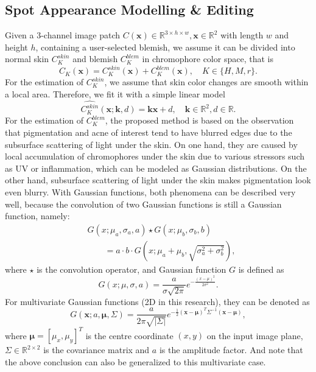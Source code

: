 \begin{spacing}{1.5}
\section{Spot Appearance Modelling \& Editing}
Given a 3-channel image patch $C(\mathbf{x})\in\mathbb{R}^{3\times h\times w}, \mathbf{x}\in\mathbb{R}^2$ with length $w$ and height $h$, containing a user-selected blemish, we assume it can be divided into normal skin $C_K^{skin}$ and blemish $C_K^{blem}$ in chromophore color space, that is
\begin{equation}
  C_K(\mathbf{x}) = C_K^{skin}(\mathbf{x}) + C_K^{blem}(\mathbf{x}),\quad K\in\{H,M,r\}.
\end{equation}
For the estimation of $C_K^{skin}$, we assume that skin color changes are smooth within a local area. Therefore, we fit it with a simple linear model
\begin{equation}
  \hat{C_K^{skin}}(\mathbf{x};\mathbf{k},d)=\mathbf{k}\mathbf{x}+d,\quad\mathbf{k}\in\mathbb{R}^2, d\in\mathbb{R}.
\end{equation}
For the estimation of $C_K^{blem}$, the proposed method is based on the observation that pigmentation and acne of interest tend to have blurred edges due to the subsurface scattering of light under the skin. On one hand, they are caused by local accumulation of chromophores under the skin due to various stressors such as UV or inflammation, which can be modeled as Gaussian distributions. On the other hand, subsurface scattering of light under the skin makes pigmentation look even blurry. With Gaussian functions, both phenomena can be described very well, because the convolution of two Gaussian functions is still a Gaussian function, namely:
\begin{equation}
    \begin{aligned}
         & G(x; \mu_a, \sigma_a, a)\star G(x; \mu_b, \sigma_b, b)                 \\
         & \qquad= a\cdot b\cdot G(x; \mu_a+\mu_b, \sqrt{\sigma_a^2+\sigma_b^2}),
    \end{aligned}
\end{equation}
where $\star$ is the convolution operator, and Gaussian function $G$ is defined as
\begin{equation}
    G(x; \mu, \sigma, a) = \frac{a}{\sigma\sqrt{2\pi}}e^{-\frac{{(x - \mu)^2}}{{2\sigma^2}}}.
\end{equation}
For multivariate Gaussian functions (2D in this research), they can be denoted as
\begin{equation}
    G(\mathbf{x}; a, \mathbf{\mu}, \Sigma)=\frac{a}{2\pi\sqrt{|\Sigma|}}e^{-\frac{1}{2}(\mathbf{x}-\mathbf{\mu})^T\Sigma^{-1}(\mathbf{x}-\mathbf{\mu})},
  \end{equation}
where $\mathbf{\mu}=[\mu_x,\mu_y]^T$ is the centre coordinate $(x,y)$ on the input image plane, $\Sigma\in\mathbb{R}^{2\times2}$ is the covariance matrix and $a$ is the amplitude factor. And note that the above conclusion can also be generalized to this multivariate case.


\end{spacing}
